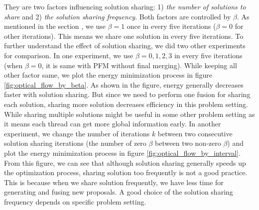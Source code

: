 They are two factors influencing solution sharing: 1) \textit{the number of solutions to share} and 2) \textit{the solution sharing frequency}. Both factors are controlled by $\beta$. As mentioned in the section \label{optical_flow}, we use $\beta = 1$ once in every five iterations ($\beta = 0$ for other iterations). This means we share one solution in every five iterations. To further understand the effect of solution sharing, we did two other experiments for comparison. In one experiment, we use $\beta = {0, 1, 2, 3}$ in every five iterations (when $\beta = 0$, it is same with PFM without final merging). While keeping all other factor same, we plot the energy minimization process in figure \ref{fig:optical_flow_by_beta}. As shown in the figure, energy generally decreases faster with solution sharing. But since we need to perform one fusion for sharing each solution, sharing more solution decreases efficiency in this problem setting. While sharing multiple solutions might be useful in some other problem setting as it means each thread can get more global information early. In another experiment, we change the number of iterations $k$ between two consecutive solution sharing iterations (the number of zero $\beta$ between two non-zero $\beta$) and plot the energy minimization process in figure \ref{fig:optical_flow_by_interval}. From this figure, we can see that although solution sharing generally speeds up the optimization process, sharing solution too frequently is not a good practice. This is because when we share solution frequently, we have less time for generating and fusing new proposals. A good choice of the solution sharing frequency depends on specific problem setting.

